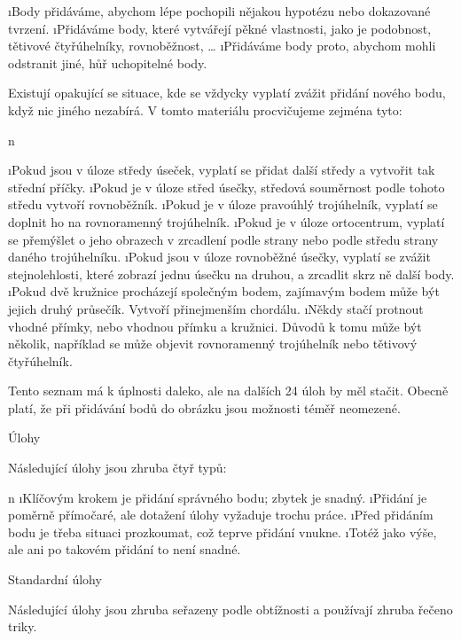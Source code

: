\begitems
\i Body přidáváme, abychom lépe pochopili nějakou hypotézu nebo dokazované tvrzení.
\i Přidáváme body, které vytvářejí pěkné vlastnosti, jako je podobnost, tětivové čtyřúhelníky, rovnoběžnost, \dots
\i Přidáváme body proto, abychom mohli odstranit jiné, hůř uchopitelné body.
\enditems

Existují opakující se situace, kde se vždycky vyplatí zvážit přidání nového bodu, když nic jiného nezabírá. V tomto materiálu procvičujeme zejména tyto:

\begitems \style n

\i Pokud jsou v úloze středy úseček, vyplatí se přidat další středy a vytvořit tak střední příčky.
\i Pokud je v úloze střed úsečky, středová souměrnost podle tohoto středu vytvoří rovnoběžník.
\i Pokud je v úloze pravoúhlý trojúhelník, vyplatí se doplnit ho na rovnoramenný trojúhelník.
\i Pokud je v úloze ortocentrum, vyplatí se přemýšlet o jeho obrazech v zrcadlení podle strany nebo podle středu strany daného trojúhelníku.
\i Pokud jsou v úloze rovnoběžné úsečky, vyplatí se zvážit stejnolehlosti, které zobrazí jednu úsečku na druhou, a zrcadlit skrz ně další body.
\i Pokud dvě kružnice procházejí společným bodem, zajímavým bodem může být jejich druhý průsečík. Vytvoří přinejmenším chordálu.
\i Někdy stačí protnout vhodné přímky, nebo vhodnou přímku a kružnici. Důvodů k tomu může být několik, například se může objevit rovnoramenný trojúhelník nebo tětivový čtyřúhelník.

\enditems

Tento seznam má k úplnosti daleko, ale na dalších 24 úloh by měl stačit. Obecně platí, že při přidávání bodů do obrázku jsou možnosti téměř neomezené.

\sec Úlohy

Následující úlohy jsou zhruba čtyř typů:

\begitems \style n
\i Klíčovým krokem je přidání správného bodu; zbytek je snadný.
\i Přidání je poměrně přímočaré, ale dotažení úlohy vyžaduje trochu práce.
\i Před přidáním bodu je třeba situaci prozkoumat, což teprve přidání vnukne.
\i Totéž jako výše, ale ani po takovém přidání to není snadné.
\enditems

\secc Standardní úlohy

Následující úlohy jsou zhruba seřazeny podle obtížnosti a používají zhruba řečeno  triky.

